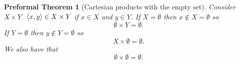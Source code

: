 \documentclass[oneside, 12pt]{book}
\theoremstyle{break}
\newtheorem{preformal definition}[definition]{Preformal Definition}
\newtheorem{preformal theorem}[theorem]{Preformal Theorem}
\begin{document}
				\begin{preformal theorem}[Cartesian products with the empty set]
					Consider $X \times Y$. 
					$\braket{x, y} \in X \times Y$ if $x\in X$ and $y\in Y$.
					If $X = \emptyset$ then $x\not \in X = \emptyset$ so
					\begin{equation*}
						\emptyset \times Y = \emptyset.
					\end{equation*}
					If $Y = \emptyset$ then $y\not \in Y = \emptyset$ so
					\begin{equation*}
						X \times \emptyset = \emptyset.
					\end{equation*}
					We also have that
					\begin{equation*}
						\emptyset \times \emptyset = \emptyset.
					\end{equation*}
				\end{preformal theorem}
				
\end{document}
